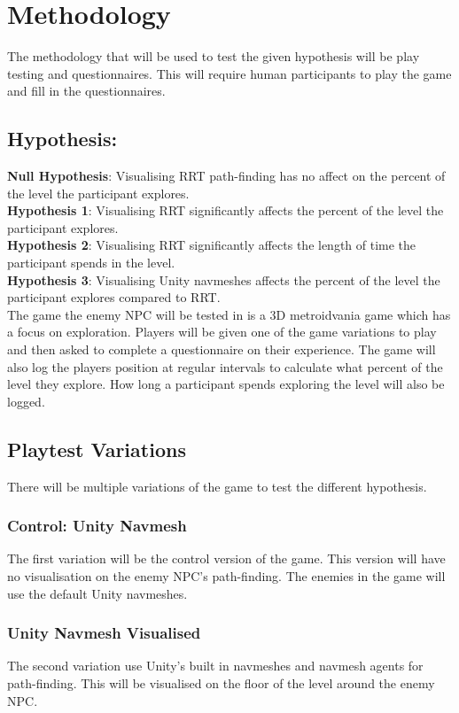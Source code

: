 \documentclass[journal]{IEEEtran}
\begin{document}
\section{Methodology}
The methodology that will be used to test the given hypothesis will be play testing and questionnaires. This will require human participants to play the game and fill in the questionnaires. 

\subsection{Hypothesis:}
\textbf{Null Hypothesis}: Visualising RRT path-finding has no affect on the percent of the level the participant explores. \\
\textbf{Hypothesis 1}: Visualising RRT significantly affects the percent of the level the participant explores. \\
\textbf{Hypothesis 2}: Visualising RRT significantly affects the length of time the participant spends in the level. \\
\textbf{Hypothesis 3}:  Visualising Unity navmeshes affects the percent of the level the participant explores compared to RRT. \\


The game the enemy NPC will be tested in is a 3D metroidvania game which has a focus on exploration. Players will be given one of the game variations to play and then asked to complete a questionnaire on their experience. The game will also log the players position at regular intervals to calculate what percent of the level they explore. How long a participant spends exploring the level will also be logged.
  

\subsection{Playtest Variations}
There will be multiple variations of the game to test the different hypothesis. 

\subsubsection{Control: Unity Navmesh}
The first variation will be the control version of the game. This version will have no visualisation on the enemy NPC's path-finding. The enemies in the game will use the default Unity navmeshes.

\subsubsection{Unity Navmesh Visualised}
The second variation use Unity's built in navmeshes and navmesh agents for path-finding. This will be visualised on the floor of the level around the enemy NPC.
\end{document}
